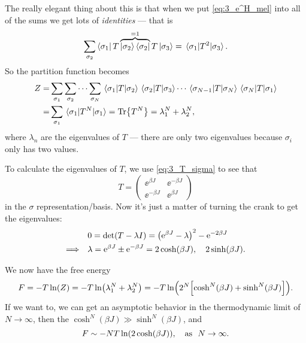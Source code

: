 \documentclass[11pt,letter, swedish, english
]{article}
\begin{document}
The really elegant thing about this is that when we put
\eqref{eq:3_e^H_mel} into all of the sums we get lots of
\emph{identities} --- that is 
\begin{equation}
\sum_{\sigma_2}\bra{\sigma_1}{T}
\overbrace{\ket{\sigma_2}\bra{\sigma_2}}^{=1}
{T}\ket{\sigma_3}
=\mel{\sigma_1}{T^2}{\sigma_3}.
\end{equation}
So the partition function becomes
\begin{equation}
\begin{aligned}
Z=&\sum_{\sigma_1}\sum_{\sigma_2}\cdots\sum_{\sigma_N}
\mel{\sigma_1}{T}{\sigma_2}\mel{\sigma_2}{T}{\sigma_3}
\cdots\mel{\sigma_{N-1}}{T}{\sigma_N}\mel{\sigma_{N}}{T}{\sigma_1}\\
=&\sum_{\sigma_1}\mel{\sigma_1}{T^N}{\sigma_1}
=\Tr{T^N}=\lambda_1^N+\lambda_2^N,
\end{aligned}
\end{equation}
where $\lambda_n$ are the eigenvalues of $T$ --- there are only two
eigenvalues because $\sigma_i$ only has two values. 

To calculate the eigenvalues of $T$, we use \eqref{eq:3_T_sigma} to
see that
\begin{equation}
T=\begin{pmatrix}
\ee^{\beta J} &\ee^{-\beta J}\\
\ee^{-\beta J} & \ee^{\beta J}
\end{pmatrix}
\end{equation}
in the $\sigma$ representation/basis. Now it's just a matter of
turning the crank to get the eigenvalues:
\begin{equation}
\begin{aligned}
&0=\det(T-\lambda I)=\qty(\ee^{\beta J}-\lambda)^2-\ee^{-2\beta J}\\
\Longrightarrow\quad&
\lambda=\ee^{\beta J}\pm\ee^{-\beta J}
=2\cosh(\beta J)\qcomma 2\sinh(\beta J). 
\end{aligned}
\end{equation}

We now have the free energy
\begin{equation}
F=-T\ln(Z)=-T\ln(\lambda_1^N+\lambda_2^N)
=-T\ln(2^N\qty[\cosh^N(\beta J) + \sinh^N(\beta J)]).
\end{equation}
If we want to, we can get an asymptotic behavior in the thermodynamic
limit of $N\to\infty$, then the $\cosh^N(\beta J)\gg\sinh^N(\beta
J)$, and
\begin{equation}
F\sim-NT\ln(2\cosh(\beta J))
\qcomma \text{as }\ N\to\infty.
\end{equation}
\end{document}
